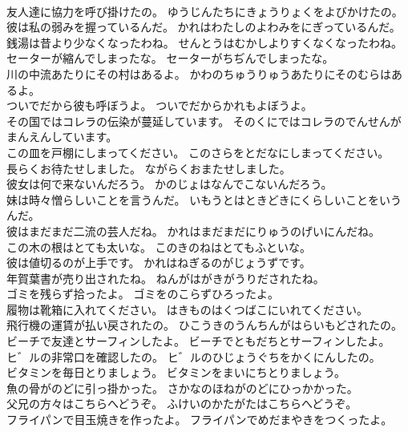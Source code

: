 \documentclass[8pt]{extreport}
\begin{document}
\begin{CJK}{UTF8}{min}
\\	友人達に協力を呼び掛けたの。	ゆうじんたちにきょうりょくをよびかけたの。 
\\	彼は私の弱みを握っているんだ。	かれはわたしのよわみをにぎっているんだ。 
\\	銭湯は昔より少なくなったわね。	せんとうはむかしよりすくなくなったわね。 
\\	セーターが縮んでしまったな。	セーターがちぢんでしまったな。 
\\	川の中流あたりにその村はあるよ。	かわのちゅうりゅうあたりにそのむらはあるよ。 
\\	ついでだから彼も呼ぼうよ。	ついでだからかれもよぼうよ。 
\\	その国ではコレラの伝染が蔓延しています。	そのくにではコレラのでんせんがまんえんしています。 
\\	この皿を戸棚にしまってください。	このさらをとだなにしまってください。 
\\	長らくお待たせしました。	ながらくおまたせしました。 
\\	彼女は何で来ないんだろう。	かのじょはなんでこないんだろう。 
\\	妹は時々憎らしいことを言うんだ。	いもうとはときどきにくらしいことをいうんだ。 
\\	彼はまだまだ二流の芸人だね。	かれはまだまだにりゅうのげいにんだね。 
\\	この木の根はとても太いな。	このきのねはとてもふといな。 
\\	彼は値切るのが上手です。	かれはねぎるのがじょうずです。 
\\	年賀葉書が売り出されたね。	ねんがはがきがうりだされたね。 
\\	ゴミを残らず拾ったよ。	ゴミをのこらずひろったよ。 
\\	履物は靴箱に入れてください。	はきものはくつばこにいれてください。 
\\	飛行機の運賃が払い戻されたの。	ひこうきのうんちんがはらいもどされたの。 
\\	ビーチで友達とサーフィンしたよ。	ビーチでともだちとサーフィンしたよ。 
\\	ヒ゛ルの非常口を確認したの。	ヒ゛ルのひじょうぐちをかくにんしたの。 
\\	ビタミンを毎日とりましょう。	ビタミンをまいにちとりましょう。 
\\	魚の骨がのどに引っ掛かった。	さかなのほねがのどにひっかかった。 
\\	父兄の方々はこちらへどうぞ。	ふけいのかたがたはこちらへどうぞ。 
\\	フライパンで目玉焼きを作ったよ。	フライパンでめだまやきをつくったよ。 

\end{CJK}
\end{document}
